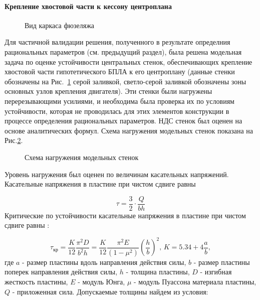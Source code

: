  \paragraph{Крепление хвостовой части к кессону центроплана} 
\label{sec:pants}
\begin{figure}[H]
\centering
\def\svgwidth{\textwidth}

\caption{Вид каркаса фюзеляжа}
\label{fig:IsoviewOfPants}
\end{figure}


Для частичной валидации решения, полученного в результате определния рациональных параметров (см. предыдущий раздел), была решена модельная задача по оценке устойчивости центральных стенок, обеспечивающих крепление хвостовой части гипотетического БПЛА к его центроплану (данные стенки обозначены на Рис.~\ref{fig:IsoviewOfPants} серой заливкой, светло-серой заливкой обозначены зоны основных узлов крепления двигателя). Эти стенки были нагружены перерезывающими усилиями, и необходима была проверка их по условиям устойчивости, которая не проводилась для этих элементов конструкции в процессе определения рациональных параметров. НДС стенок был оценен на основе аналитических формул. Схема нагружения модельных стенок показана на Рис.\ref{fig:IsoviewOfPantsModel}.

\begin{figure}[H]
\centering

\caption{Схема нагружения модельных стенок}
\label{fig:IsoviewOfPantsModel}
\end{figure}

%


Уровень нагружения был оценен по величинам касательных напряжений. Касательные напряжения в пластине при чистом сдвиге равны

\begin{equation}
\tau=\frac{3}{2}\cdot\frac{Q}{bh}
\end{equation}
Критические по устойчивости касательные напряжения в пластине при чистом сдвиге равны \cite{Volmir}:

\begin{equation}
\tau_\text{кр}=\frac{K}{12}\frac{\pi^2D}{b^2h} = \frac{K}{12}\frac{\pi^2E}{(1-\mu^2)}\left(\frac{h}{b}\right)^2,\, K=5.34 + 4\frac{a}{b},
\end{equation}
где $a$ - размер пластины вдоль направления действия силы, $b$ - размер пластины поперек направления действия силы, $h$ - толщина пластины, $D$ - изгибная жесткость пластины, $E$ - модуль Юнга, $\mu$ - модуль Пуассона материала пластины, $Q$ - приложенная сила.
Допускаемые толщины найдем из условия:


